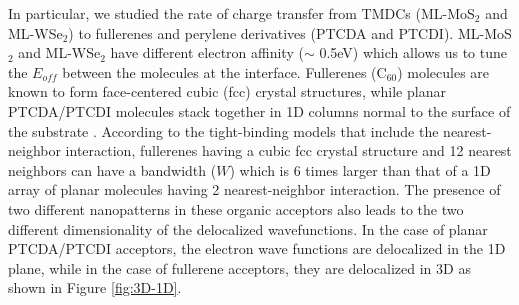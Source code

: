 \documentclass[12pt]{article}
\begin{document}
In particular, we studied the rate of charge transfer from TMDCs (ML-MoS$_2$ and ML-WSe$_2$) to fullerenes and perylene derivatives (PTCDA and PTCDI). ML-MoS$_2$ and ML-WSe$_2$ have different electron affinity ($\sim$ 0.5eV) which allows us to tune the $E_{off}$ between the molecules at the interface. Fullerenes (C$_{60}$) molecules are known to form face-centered cubic (fcc) crystal structures, while planar PTCDA/PTCDI molecules stack together in 1D columns normal to the surface of the substrate \cite{ching1991first,ludwig1994stm}. According to the tight-binding models that include the nearest-neighbor interaction, fullerenes having a cubic fcc crystal structure and 12 nearest neighbors can have a bandwidth ($W$) which is 6 times larger than that of a 1D array of planar molecules having 2 nearest-neighbor interaction. The presence of two different nanopatterns in these organic acceptors also leads to the two different dimensionality of the delocalized wavefunctions. In the case of planar PTCDA/PTCDI acceptors, the electron wave functions are delocalized in the 1D plane, while in the case of fullerene acceptors, they are delocalized in 3D as shown in Figure \ref{fig:3D-1D}.
\end{document}
